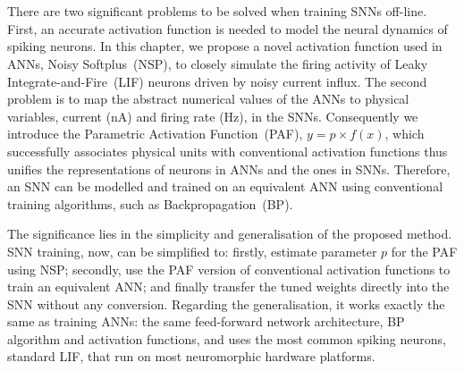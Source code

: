 \DIFaddbegin \section{}
\label{sec:intro_NSP}
\DIFaddend There are two significant problems to be solved when training SNNs off-line.
First, an accurate activation function is needed to model the neural dynamics of spiking neurons.
In this chapter, we propose a novel activation function used in ANNs, Noisy Softplus~(NSP), to closely simulate the firing activity of Leaky Integrate-and-Fire~(LIF) neurons driven by noisy current influx.
The second problem is to map the abstract numerical values of the ANNs to physical variables, current (nA) and firing rate (Hz), in the SNNs.
Consequently we introduce the Parametric Activation Function~(PAF), $y = p \times f(x)$, which successfully associates physical units with conventional activation functions thus unifies the representations of neurons in ANNs and the ones in SNNs.
Therefore, an SNN can be modelled and trained on an equivalent ANN using conventional training algorithms, such as Backpropagation~(BP).

The significance lies in the simplicity and generalisation of the proposed method.
SNN training, now, can be simplified to: firstly, estimate parameter $p$ for the PAF using NSP; secondly, use the PAF version of conventional activation functions to train an equivalent ANN; and finally transfer the tuned weights directly into the SNN without any conversion.
Regarding the generalisation, it works exactly the same as training ANNs: the same feed-forward network architecture, BP algorithm and activation functions, and uses the most common spiking neurons, standard LIF, that run on most neuromorphic hardware platforms.

